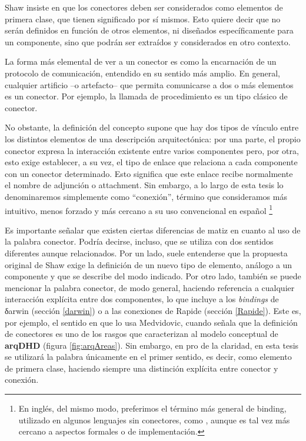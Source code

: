 Shaw insiste en que los conectores deben ser considerados como elementos de
primera clase, que tienen significado por sí mismos. Esto quiere decir que no
serán definidos en función de otros elementos, ni diseñados específicamente
para un componente, sino que podrán ser extraídos y considerados en otro
contexto.

La forma más elemental de ver a un conector es como la encarnación de un
protocolo de comunicación, entendido en su sentido más amplio. En general,
cualquier artificio –o artefacto– que permita comunicarse a dos o más elementos
es un conector. Por ejemplo, la llamada de procedimiento es un tipo clásico de
conector.

No obstante, la definición del concepto supone que hay dos tipos de vínculo
entre los distintos elementos de una descripción arquitectónica: por una
parte, el propio conector expresa la interacción existente entre varios
componentes pero, por otra, esto exige establecer, a su vez,
el tipo de enlace que relaciona a cada componente con un conector determinado. Esto significa que este enlace recibe normalmente el nombre de adjunción o attachment. Sin
embargo, a lo largo de esta tesis lo denominaremos simplemente como “conexión”,
término que consideramos más intuitivo, menos forzado y más cercano a su uso
convencional en español \footnote{En inglés, del mismo modo, preferimos el
término más general de binding, utilizado en algunos lenguajes sin conectores,
como , aunque es tal vez más cercano a aspectos formales o
de implementación.}


Es importante señalar que existen ciertas diferencias de matiz en cuanto al
uso de la palabra conector. Podría decirse, incluso, que se utiliza con
dos sentidos diferentes aunque relacionados.
Por un lado,  suele entenderse que la propuesta original de Shaw exige la
definición de un nuevo tipo de elemento, análogo a un componente y que se
describe del modo indicado. Por otro lado, también se puede mencionar la palabra
conector, de modo general, haciendo referencia a cualquier interacción
explícita entre dos componentes, lo que incluye a los \textit{bindings}
de δarwin (sección \ref{darwin}) o a las conexiones de Rapide (sección
\ref{Rapide}). Este es, por ejemplo, el sentido en que lo usa Medvidovic, cuando 
señala que la definición de conectores es uno de los rasgos que
caracterizan al modelo conceptual de \textbf{arqDHD} (figura \ref{fig:arqAreas}). Sin embargo, en pro de la claridad, en esta tesis se utilizará la palabra únicamente en el 
primer sentido, es decir, como elemento de primera clase, haciendo siempre una distinción
explícita entre conector y conexión.


